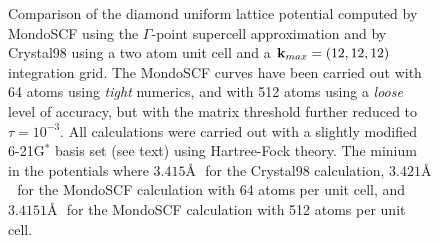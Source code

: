\documentclass[prb,aps,nobibnotes,twocolumn,doublespace,twocolumngrid,superbib]{revtex4}
\begin{document}
\begin{figure}
\caption{Comparison of the diamond uniform lattice potential computed 
by MondoSCF using the $\Gamma$-point supercell approximation and by {\sc Crystal98}
using a two atom unit cell and a ${\bf k}_{max} = (12,12,12)$ integration grid.
The {\sc MondoSCF} curves have been carried out with 64 atoms using {\it tight}
numerics, and with 512 atoms using a {\it loose} level of accuracy, but with the matrix
threshold further reduced to $\tau=10^{-3}$.  
All calculations were carried out with a slightly 
modified 6-21G$^*$ basis set (see text) using Hartree-Fock theory.
The minium in the potentials where $3.415$\AA $\,\,$ for the {\sc Crystal98} calculation, $3.421$\AA $\,\,$
for the {\sc MondoSCF} calculation with 64 atoms per unit cell, and  $3.4151$\AA $\,\,$  for the
{\sc MondoSCF} calculation with 512 atoms per unit cell. }
\label{CarbonEnergyVsLattice}
\end{figure}
%
%
%
\suppressfloats
\end{document}
